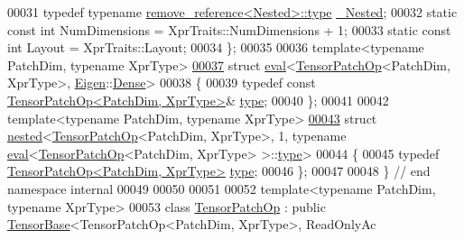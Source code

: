 \begin{DoxyCode}
00031   \textcolor{keyword}{typedef} \textcolor{keyword}{typename} \hyperlink{group___sparse_core___module}{remove\_reference<Nested>::type} 
      \hyperlink{group___sparse_core___module}{\_Nested};
00032   \textcolor{keyword}{static} \textcolor{keyword}{const} \textcolor{keywordtype}{int} NumDimensions = XprTraits::NumDimensions + 1;
00033   \textcolor{keyword}{static} \textcolor{keyword}{const} \textcolor{keywordtype}{int} Layout = XprTraits::Layout;
00034 \};
00035 
00036 \textcolor{keyword}{template}<\textcolor{keyword}{typename} PatchDim, \textcolor{keyword}{typename} XprType>
\hyperlink{struct_eigen_1_1internal_1_1eval_3_01_tensor_patch_op_3_01_patch_dim_00_01_xpr_type_01_4_00_01_eigen_1_1_dense_01_4}{00037} \textcolor{keyword}{struct }\hyperlink{struct_eigen_1_1internal_1_1eval}{eval}<\hyperlink{class_eigen_1_1_tensor_patch_op}{TensorPatchOp}<PatchDim, XprType>, \hyperlink{namespace_eigen}{Eigen}::\hyperlink{struct_eigen_1_1_dense}{Dense}>
00038 \{
00039   \textcolor{keyword}{typedef} \textcolor{keyword}{const} \hyperlink{class_eigen_1_1_tensor_patch_op}{TensorPatchOp<PatchDim, XprType>}& 
      \hyperlink{class_eigen_1_1_tensor_patch_op}{type};
00040 \};
00041 
00042 \textcolor{keyword}{template}<\textcolor{keyword}{typename} PatchDim, \textcolor{keyword}{typename} XprType>
\hyperlink{struct_eigen_1_1internal_1_1nested_3_01_tensor_patch_op_3_01_patch_dim_00_01_xpr_type_01_4_00_017d8350baeaabc5f17d005b7a04cfaf28}{00043} \textcolor{keyword}{struct }\hyperlink{struct_eigen_1_1internal_1_1nested}{nested}<\hyperlink{class_eigen_1_1_tensor_patch_op}{TensorPatchOp}<PatchDim, XprType>, 1, typename 
      \hyperlink{struct_eigen_1_1internal_1_1eval}{eval}<\hyperlink{class_eigen_1_1_tensor_patch_op}{TensorPatchOp}<PatchDim, XprType> >::\hyperlink{class_eigen_1_1_tensor_patch_op}{type}>
00044 \{
00045   \textcolor{keyword}{typedef} \hyperlink{class_eigen_1_1_tensor_patch_op}{TensorPatchOp<PatchDim, XprType>} \hyperlink{class_eigen_1_1_tensor_patch_op}{type};
00046 \};
00047 
00048 \}  \textcolor{comment}{// end namespace internal}
00049 
00050 
00051 
00052 \textcolor{keyword}{template}<\textcolor{keyword}{typename} PatchDim, \textcolor{keyword}{typename} XprType>
00053 \textcolor{keyword}{class }\hyperlink{class_eigen_1_1_tensor_patch_op}{TensorPatchOp} : \textcolor{keyword}{public} \hyperlink{class_eigen_1_1_tensor_base}{TensorBase}<TensorPatchOp<PatchDim, XprType>, ReadOnlyAc

\end{DoxyCode}
